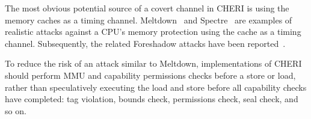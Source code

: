 The most obvious potential source of a covert channel in CHERI is using the
memory caches as a timing channel. Meltdown~\cite{Lipp2018meltdown} and
Spectre~\cite{Kocher2018spectre} are examples of realistic attacks against
a CPU's memory protection using the cache as a timing channel.
Subsequently, the related Foreshadow attacks have been reported~\cite{Foreshadow,Foreshadow-NG}.

To reduce the risk of an attack similar to Meltdown, implementations of CHERI
should perform MMU and capability permissions checks before a store or load,
rather than speculatively executing the load and store before all capability
checks have completed: tag violation, bounds check, permissions check, seal
check, and so on.
